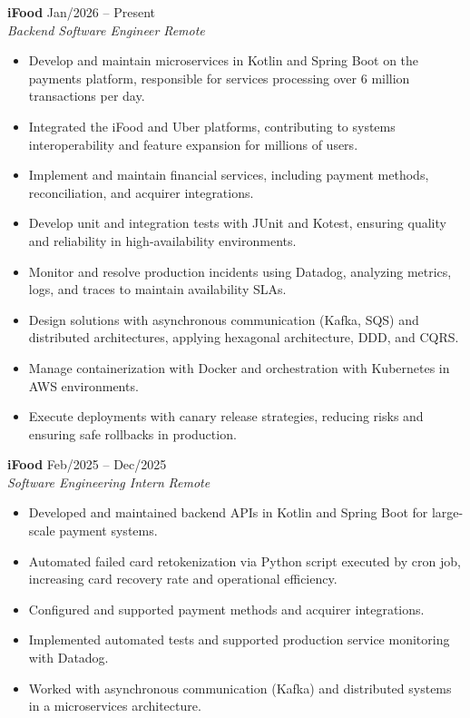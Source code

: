 \documentclass[a4paper,10pt]{article}
\newcommand{\entry}[4]{
  \noindent\textbf{#1} \hfill #2 \\
  \noindent\textit{#3} \hfill \textit{#4} \\
  \vspace{2pt}
}
\begin{document}
\vspace{0.6em}

\entry{iFood}{\faCalendar \space Jan/2026 -- Present}{Backend Software Engineer}{\faMapMarker \space Remote}
\space
\vspace{-1.6em}
\begin{itemize}
\setlength\itemsep{0em}
\item Develop and maintain microservices in Kotlin and Spring Boot on the payments platform, responsible for services processing over 6 million transactions per day.
\item Integrated the iFood and Uber platforms, contributing to systems interoperability and feature expansion for millions of users.
\item Implement and maintain financial services, including payment methods, reconciliation, and acquirer integrations.
\item Develop unit and integration tests with JUnit and Kotest, ensuring quality and reliability in high-availability environments.
\item Monitor and resolve production incidents using Datadog, analyzing metrics, logs, and traces to maintain availability SLAs.
\item Design solutions with asynchronous communication (Kafka, SQS) and distributed architectures, applying hexagonal architecture, DDD, and CQRS.
\item Manage containerization with Docker and orchestration with Kubernetes in AWS environments.
\item Execute deployments with canary release strategies, reducing risks and ensuring safe rollbacks in production.
\end{itemize}

\entry{iFood}{\faCalendar \space Feb/2025 -- Dec/2025}{Software Engineering Intern}{\faMapMarker \space Remote}
\space
\vspace{-1.6em}
\begin{itemize}
\setlength\itemsep{0em}
\item Developed and maintained backend APIs in Kotlin and Spring Boot for large-scale payment systems.
\item Automated failed card retokenization via Python script executed by cron job, increasing card recovery rate and operational efficiency.
\item Configured and supported payment methods and acquirer integrations.
\item Implemented automated tests and supported production service monitoring with Datadog.
\item Worked with asynchronous communication (Kafka) and distributed systems in a microservices architecture.
\end{itemize}
\end{document}
